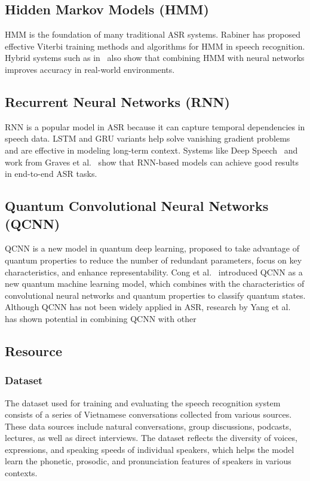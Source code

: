 \documentclass[conference]{IEEEtran}
\begin{document}
\subsection{Hidden Markov Models (HMM)}

HMM is the foundation of many traditional ASR systems. Rabiner \cite{rabiner1989tutorial} has proposed effective Viterbi training methods and algorithms for HMM in speech recognition. Hybrid systems such as in~\cite{voll2007hybrid, perero2022comparison} also show that combining HMM with neural networks improves accuracy in real-world environments.

\subsection{Recurrent Neural Networks (RNN)}

RNN is a popular model in ASR because it can capture temporal dependencies in speech data. LSTM and GRU variants help solve vanishing gradient problems and are effective in modeling long-term context. Systems like Deep Speech~\cite{hannun2014deep} and work from Graves et al.~\cite{graves2013speech} show that RNN-based models can achieve good results in end-to-end ASR tasks.

\subsection{Quantum Convolutional Neural Networks (QCNN)}

QCNN is a new model in quantum deep learning, proposed to take advantage of quantum properties to reduce the number of redundant parameters, focus on key characteristics, and enhance representability. Cong et al.~\cite{Cong2019QuantumCNN} introduced QCNN as a new quantum machine learning model, which combines with the characteristics of convolutional neural networks and quantum properties to classify quantum states. Although QCNN has not been widely applied in ASR, research by Yang et al.~\cite{Yang2021Decentralizing} has shown potential in combining QCNN with other

\subsection{Resource}
\subsubsection{Dataset}
The dataset used for training and evaluating the speech recognition system consists of a series of Vietnamese conversations collected from various sources. These data sources include natural conversations, group discussions, podcasts, lectures, as well as direct interviews. The dataset reflects the diversity of voices, expressions, and speaking speeds of individual speakers, which helps the model learn the phonetic, prosodic, and pronunciation features of speakers in various contexts.
\end{document}
